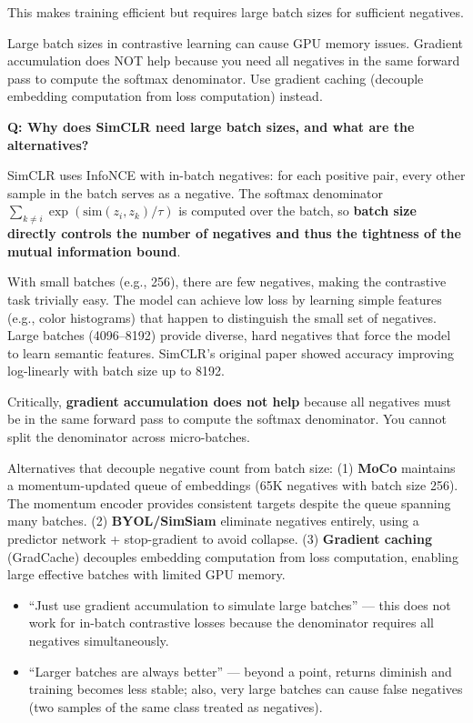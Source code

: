 This makes training efficient but requires large batch sizes for sufficient negatives.

\begin{warningbox}
Large batch sizes in contrastive learning can cause GPU memory issues. Gradient accumulation does NOT help because you need all negatives in the same forward pass to compute the softmax denominator. Use gradient caching (decouple embedding computation from loss computation) instead.
\end{warningbox}

\begin{interviewq}
\textbf{Q: Why does SimCLR need large batch sizes, and what are the alternatives?}

 \quad {} \quad \badgefreq{\freqhigh}

\stronganswer SimCLR uses InfoNCE with in-batch negatives: for each positive pair, every other sample in the batch serves as a negative. The softmax denominator $\sum_{k \neq i} \exp(\text{sim}(z_i, z_k)/\tau)$ is computed over the batch, so \textbf{batch size directly controls the number of negatives and thus the tightness of the mutual information bound}.

With small batches (e.g., 256), there are few negatives, making the contrastive task trivially easy. The model can achieve low loss by learning simple features (e.g., color histograms) that happen to distinguish the small set of negatives. Large batches (4096--8192) provide diverse, hard negatives that force the model to learn semantic features. SimCLR's original paper showed accuracy improving log-linearly with batch size up to 8192.

Critically, \textbf{gradient accumulation does not help} because all negatives must be in the same forward pass to compute the softmax denominator. You cannot split the denominator across micro-batches.

Alternatives that decouple negative count from batch size: (1) \textbf{MoCo} maintains a momentum-updated queue of embeddings (65K negatives with batch size 256). The momentum encoder provides consistent targets despite the queue spanning many batches. (2) \textbf{BYOL/SimSiam} eliminate negatives entirely, using a predictor network + stop-gradient to avoid collapse. (3) \textbf{Gradient caching} (GradCache) decouples embedding computation from loss computation, enabling large effective batches with limited GPU memory.

\redflags
\begin{itemize}
    \item ``Just use gradient accumulation to simulate large batches'' --- this does not work for in-batch contrastive losses because the denominator requires all negatives simultaneously.
    \item ``Larger batches are always better'' --- beyond a point, returns diminish and training becomes less stable; also, very large batches can cause false negatives (two samples of the same class treated as negatives).
\end{itemize}


\end{interviewq}
